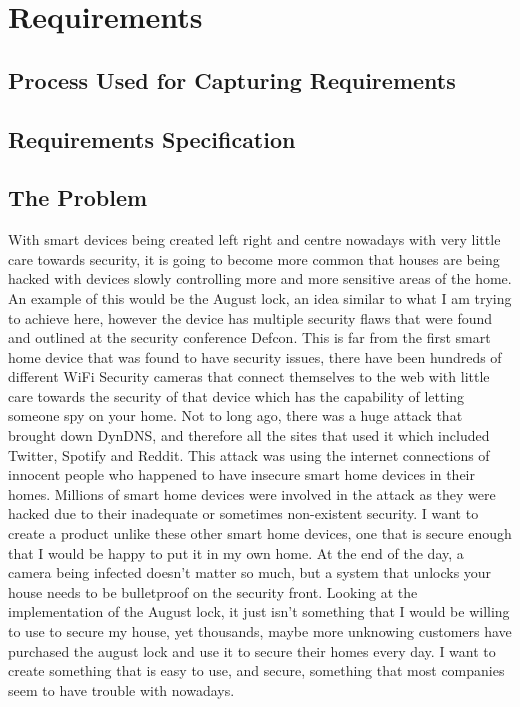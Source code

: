 \chapter{Requirements}
\label{chap:requirements}

\section{Process Used for Capturing Requirements}

\section{Requirements Specification}

\section{The Problem}
With smart devices being created left right and centre nowadays with very little care towards security, it is going to become more common that houses are being hacked with devices slowly controlling more and more sensitive areas of the home. An example of this would be the August lock, an idea similar to what I am trying to achieve here, however the device has multiple security flaws that were found and outlined at the security conference Defcon. This is far from the first smart home device that was found to have security issues, there have been hundreds of different WiFi Security cameras that connect themselves to the web with little care towards the security of that device which has the capability of letting someone spy on your home. Not to long ago, there was a huge attack that brought down DynDNS, and therefore all the sites that used it which included Twitter, Spotify and Reddit. This attack was using the internet connections of innocent people who happened to have insecure smart home devices in their homes. Millions of smart home devices were involved in the attack as they were hacked due to their inadequate or sometimes non-existent security.
\newline
\newline
I want to create a product unlike these other smart home devices, one that is secure enough that I would be happy to put it in my own home. At the end of the day, a camera being infected doesn't matter so much, but a system that unlocks your house needs to be bulletproof on the security front. Looking at the implementation of the August lock, it just isn't something that I would be willing to use to secure my house, yet thousands, maybe more unknowing customers have purchased the august lock and use it to secure their homes every day. I want to create something that is easy to use, and secure, something that most companies seem to have trouble with nowadays.

